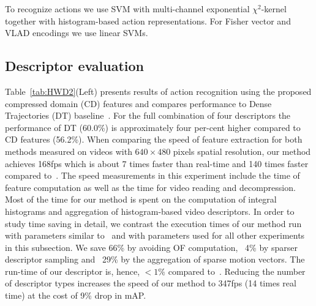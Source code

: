 \documentclass[10pt,twocolumn,letterpaper]{article}
\begin{document}
To recognize actions we use SVM with multi-channel exponential $\chi^2$-kernel~\cite{Zhang07} together with histogram-based action representations. For Fisher vector and VLAD encodings we use linear SVMs.


\subsection{Descriptor evaluation}

Table~\ref{tab:HWD2}(Left) presents results of action recognition using the proposed compressed domain (CD) features %
and compares performance to Dense Trajectories (DT) baseline~\cite{Wang12}. For the full combination of four descriptors the performance of DT (60.0\%) is approximately four per-cent higher compared to CD features (56.2\%). When comparing the speed of feature extraction for both methods measured on videos with $640\times480$ pixels spatial resolution, our method achieves 168fps which is about 7 times faster than real-time and 140 times faster compared to~\cite{Wang12}. The speed measurements in this experiment include the time of feature computation as well as the time for video reading and decompression. Most of the time for our method is spent on the computation of integral histograms and aggregation of histogram-based video descriptors. In order to  study time saving in detail, we contrast the execution times of our method run with parameters similar to~\cite{Wang12} and with parameters used for all other experiments in this subsection. We save 66\% by avoiding OF computation, ~4\% by sparser descriptor sampling and ~29\% by the aggregation of sparse motion vectors. The run-time of our descriptor is, hence, $<1\%$ compared to~\cite{Wang12}. Reducing the number of descriptor types increases the speed of our method to 347fps (14 times real time) at the cost of 9\% drop in mAP. 

\end{document}
